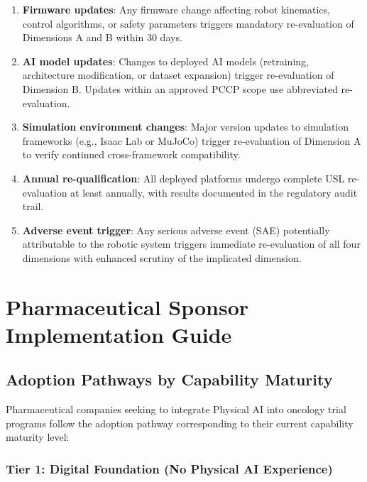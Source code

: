 \documentclass[11pt,letterpaper]{article}
\begin{document}
\begin{enumerate}
  \item \textbf{Firmware updates}: Any firmware change affecting robot kinematics, control algorithms, or safety parameters triggers mandatory re-evaluation of Dimensions A and B within 30 days.
  \item \textbf{AI model updates}: Changes to deployed AI models (retraining, architecture modification, or dataset expansion) trigger re-evaluation of Dimension B. Updates within an approved PCCP scope \MAY{} use abbreviated re-evaluation.
  \item \textbf{Simulation environment changes}: Major version updates to simulation frameworks (e.g., Isaac Lab or MuJoCo) trigger re-evaluation of Dimension A to verify continued cross-framework compatibility.
  \item \textbf{Annual re-qualification}: All deployed platforms \SHALL{} undergo complete USL re-evaluation at least annually, with results documented in the regulatory audit trail.
  \item \textbf{Adverse event trigger}: Any serious adverse event (SAE) potentially attributable to the robotic system triggers immediate re-evaluation of all four dimensions with enhanced scrutiny of the implicated dimension.
\end{enumerate}

\section{Pharmaceutical Sponsor Implementation Guide}
\label{sec:part6}

\subsection{Adoption Pathways by Capability Maturity}

Pharmaceutical companies seeking to integrate Physical AI into oncology trial programs \SHOULD{} follow the adoption pathway corresponding to their current capability maturity level:

\subsubsection{Tier 1: Digital Foundation (No Physical AI Experience)}
\end{document}
